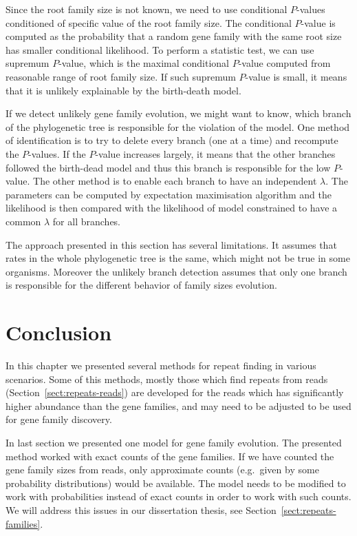 Since the root family size is not known, we need to use conditional $P$-values conditioned of specific value of the root family size.
The conditional $P$-value is computed as the probability that a random gene family with the same root size has smaller conditional likelihood.
To perform a statistic test, we can use supremum $P$-value, which is the maximal conditional $P$-value computed from reasonable range of root family size.
If such supremum $P$-value is small, it means that it is unlikely explainable by the birth-death model.

If we detect unlikely gene family evolution, we might want to know, which branch of the phylogenetic tree is responsible for the violation of the model.
One method of identification is to try to delete every branch (one at a time) and recompute the $P$-values. If the $P$-value increases largely, it means that the other branches followed the birth-dead model and thus this branch is responsible for the low $P$-value.
The other method is to enable each branch to have an independent $\lambda$. The parameters can be computed by expectation maximisation algorithm and the likelihood is then compared with the likelihood of model constrained to have a common $\lambda$ for all branches.

The approach presented in this section has several limitations. It assumes that rates in the whole phylogenetic tree is the same, which might not be true in some organisms. Moreover the unlikely branch detection assumes that only one branch is responsible for the different behavior of family sizes evolution.

\section{Conclusion}

In this chapter we presented several methods for repeat finding in various scenarios.
Some of this methods, mostly those which find repeats from reads (Section~\ref{sect:repeats-reads}) are developed for the reads which has significantly higher abundance than the gene families, and may need to be adjusted to be used for gene family discovery.

In last section we presented one model for gene family evolution. The presented method worked with exact counts of the gene families. If we have counted the gene family sizes from reads, only approximate counts (e.g.\ given by some probability distributions) would be available. The model needs to be modified to work with probabilities instead of exact counts in order to work with such counts.
We will address this issues in our dissertation thesis, see Section~\ref{sect:repeats-families}.

